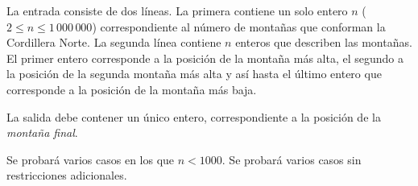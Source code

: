 \documentclass{oci}
\begin{document}
\begin{inputDescription}

La entrada consiste de dos líneas.
La primera contiene un solo entero $n$ ($2 \leq n \leq 1\,000\,000$)
correspondiente al número de montañas que conforman la Cordillera Norte.
La segunda línea contiene $n$ enteros que describen las montañas.
El primer entero corresponde a la posición de la montaña más alta, el segundo a la posición
de la segunda montaña más alta y así hasta el último entero que corresponde a la posición
de la montaña más baja.

\end{inputDescription}

\begin{outputDescription}
La salida debe contener un único entero, correspondiente a la posición de la \emph{montaña final}.
\end{outputDescription}

\begin{scoreDescription}
  Se probará varios casos en los que $n<1000$.
  Se probará varios casos sin restricciones adicionales.
\end{scoreDescription}

\begin{sampleDescription}
\end{sampleDescription}
\end{document}
